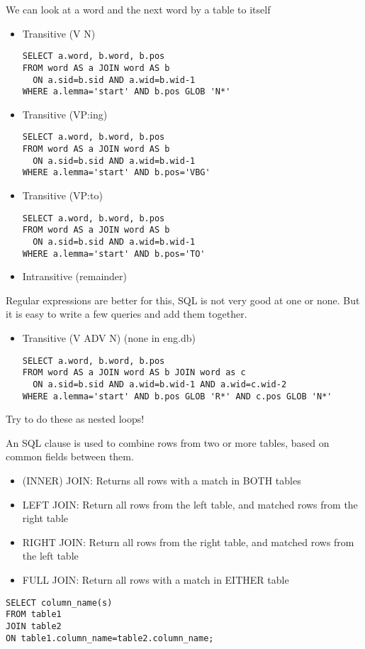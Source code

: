 \documentclass[a4paper,landscape,headrule,footrule,dvips]{foils}
\begin{document}
\begin{CJK}{UTF8}{min}

We can look at a word and the next word by  a table to itself

\begin{itemize}
\item Transitive (V N) 
\begin{verbatim}
SELECT a.word, b.word, b.pos
FROM word AS a JOIN word AS b 
  ON a.sid=b.sid AND a.wid=b.wid-1
WHERE a.lemma='start' AND b.pos GLOB 'N*'
\end{verbatim}
\item Transitive (VP:ing)
\begin{verbatim}
SELECT a.word, b.word, b.pos
FROM word AS a JOIN word AS b 
  ON a.sid=b.sid AND a.wid=b.wid-1
WHERE a.lemma='start' AND b.pos='VBG'
\end{verbatim}
\newpage
\item Transitive (VP:to)
\begin{verbatim}
SELECT a.word, b.word, b.pos
FROM word AS a JOIN word AS b 
  ON a.sid=b.sid AND a.wid=b.wid-1
WHERE a.lemma='start' AND b.pos='TO'
\end{verbatim}
\item Intransitive (remainder)
\end{itemize}

Regular expressions are better for this, SQL is not very good at one
or none.  But it is easy to write a few queries and add them together.
\newpage
\begin{itemize}
\item Transitive (V ADV N) (none in eng.db)
\begin{verbatim}
SELECT a.word, b.word, b.pos
FROM word AS a JOIN word AS b JOIN word as c
  ON a.sid=b.sid AND a.wid=b.wid-1 AND a.wid=c.wid-2
WHERE a.lemma='start' AND b.pos GLOB 'R*' AND c.pos GLOB 'N*'
\end{verbatim}
\end{itemize}

Try to do these as nested loops!



An SQL  clause is used to combine rows from two or more
tables, based on common fields between them.

\begin{itemize}\addtolength{\itemsep}{-1ex}
\item (INNER) JOIN: Returns all rows with a  match in BOTH tables
\item LEFT JOIN: Return all rows from the left table, and matched rows from the right table
\item RIGHT JOIN: Return all rows from the right table, and matched rows from the left table
\item FULL JOIN: Return all rows with a match in EITHER table
\end{itemize}
\begin{verbatim}
SELECT column_name(s)
FROM table1
JOIN table2
ON table1.column_name=table2.column_name;
\end{verbatim}



\end{CJK}
\end{document}
